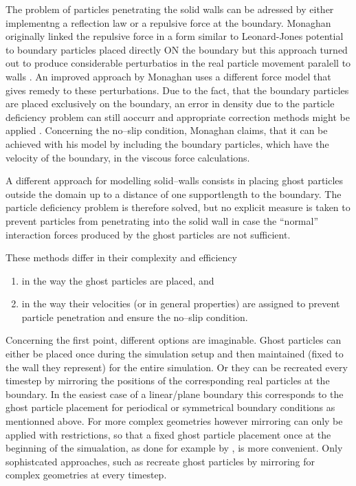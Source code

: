 \documentclass{report}
\begin{document}
The problem of particles penetrating the solid walls can be adressed by either implementng a reflection law or a repulsive force at the boundary. Monaghan originally linked the repulsive force in a form similar to Leonard-Jones potential to boundary particles placed directly ON the boundary \cite{Monaghan1994} but this approach turned out to produce considerable perturbatios in the real particle movement paralell to walls \cite{Monaghan2005}. An improved approach by Monaghan uses a different force model \cite{Monaghan2004} that gives remedy to these perturbations. Due to the fact, that the boundary particles are placed exclusively on the boundary, an error in density due to the particle deficiency problem can still aoccurr and appropriate correction methods might be applied \cite{Monaghan2004}. Concerning the no--slip condition, Monaghan claims, that it can be achieved with his model by including the boundary particles, which have the velocity of the boundary, in the viscous force calculations. 

A different approach for modelling solid--walls consists in placing ghost particles outside the domain up to a distance of one supportlength to the boundary. The particle deficiency problem is therefore solved, but no explicit measure is taken to prevent particles from penetrating into the solid wall in case the ``normal'' interaction forces produced by the ghost particles are not sufficient.

 These methods differ in their complexity and efficiency 
\begin{enumerate}
  \item in the way the ghost particles are placed, and
\item in the way their velocities (or in general properties) are assigned to prevent particle penetration and ensure the no--slip condition.
 \end{enumerate}

Concerning the first point, different options are imaginable. Ghost particles can either be placed once during the simulation setup and then maintained (fixed to the wall they represent) for the entire simulation. Or they can be recreated every timestep by mirroring the positions of the corresponding real particles at the boundary. In the easiest case of a linear/plane boundary this corresponds to the ghost particle placement for periodical or symmetrical boundary conditions as mentionned above.
For more complex geometries however mirroring can only be applied with restrictions, so that a fixed ghost particle placement once at the beginning of the simualation, as done for example by \cite{Morris1997, Morris1999}, is more convenient. Only sophistcated approaches, such as \cite{Yildit2009} recreate ghost particles by mirroring for complex geometries at every timestep.
\end{document}
